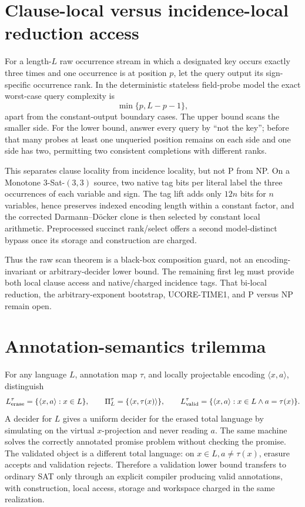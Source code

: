 \documentclass[11pt]{article}
\begin{document}
\section{Clause-local versus incidence-local reduction access}
For a length-$L$ raw occurrence stream in which a designated key occurs
exactly three times and one occurrence is at position $p$, let the query
output its sign-specific occurrence rank.  In the deterministic stateless
field-probe model the exact worst-case query complexity is
\[
 \min\{p,L-p-1\},
\]
apart from the constant-output boundary cases.  The upper bound scans the
smaller side.  For the lower bound, answer every query by ``not the key'';
before that many probes at least one unqueried position remains on each side
and one side has two, permitting two consistent completions with different
ranks.

This separates clause locality from incidence locality, but not P from NP.
On a Monotone 3-Sat-$(3,3)$ source, two native tag bits per literal label the
three occurrences of each variable and sign.  The tag lift adds only $12n$
bits for $n$ variables, hence preserves indexed encoding length within a
constant factor, and the corrected Darmann--D\"ocker clone is then selected
by constant local arithmetic.  Preprocessed succinct rank/select offers a
second model-distinct bypass once its storage and construction are charged.

Thus the raw scan theorem is a black-box composition guard, not an
encoding-invariant or arbitrary-decider lower bound.  The remaining first
leg must provide both local clause access and native/charged incidence tags.
That bi-local reduction, the arbitrary-exponent bootstrap, UCORE-TIME1, and
P versus NP remain open.

\section{Annotation-semantics trilemma}
For any language \(L\), annotation map \(\tau\), and locally projectable
encoding \(\langle x,a\rangle\), distinguish
\[
 L_{\rm erase}^{\tau}=\{\langle x,a\rangle:x\in L\},
 \qquad
 \Pi_L^\tau=\{\langle x,\tau(x)\rangle\},
 \qquad
 L_{\rm valid}^{\tau}=\{\langle x,a\rangle:x\in L\wedge a=\tau(x)\}.
\]
A decider for \(L\) gives a uniform decider for the erased total language by
simulating on the virtual \(x\)-projection and never reading \(a\).  The same
machine solves the correctly annotated promise problem without checking the
promise.  The validated object is a different total language: on
\(x\in L,a\ne\tau(x)\), erasure accepts and validation rejects.  Therefore a
validation lower bound transfers to ordinary SAT only through an explicit
compiler producing valid annotations, with construction, local access,
storage and workspace charged in the same realization.
\end{document}
